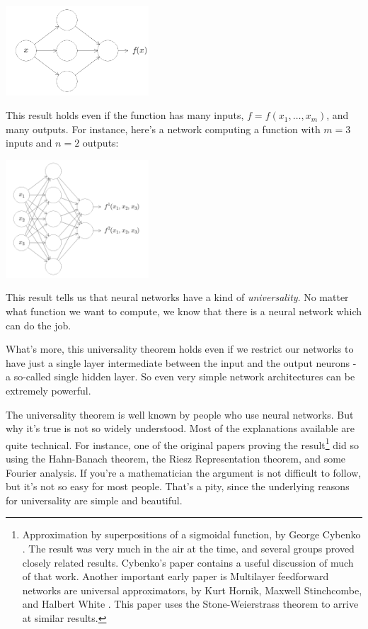 {\centering \includegraphics[width=0.4\textwidth,]{pic/wigglyfn02.png} \par}

This result holds even if the function has many inputs, $f=f(x_1,\ldots,x_m)$, and many outputs. For instance, here's a network computing a function with $m=3$ inputs and $n=2$
outputs:

{\centering \includegraphics[width=0.4\textwidth,]{pic/wigglyfn03.png} \par}

This result tells us that neural networks have a kind of \textit{universality}. No matter what function we want to compute, we know that there is a neural network which can do the job.

What's more, this universality theorem holds even if we restrict our networks to have just a single layer intermediate between the input and the output neurons - a so-called single hidden layer. So even very simple network architectures can be extremely powerful.

The universality theorem is well known by people who use neural networks. But why it's true is not so widely understood. Most of the explanations available are quite technical. For instance, one of the original papers proving the result\footnote{Approximation by superpositions of a sigmoidal function, by George Cybenko \cite{Cybenko1989}. The result was very much in the air at the time, and several groups proved closely related results. Cybenko's paper contains a useful discussion of much of that work. Another important early paper is Multilayer feedforward networks are universal approximators, by Kurt Hornik, Maxwell Stinchcombe, and Halbert White \cite{Hornik1989}. This paper uses the Stone-Weierstrass theorem to arrive at similar results.} did so using the Hahn-Banach theorem, the Riesz Representation theorem, and some Fourier analysis. If you're a mathematician the argument is not difficult to follow, but it's not so easy for most people. That's a pity, since the underlying reasons for universality are simple and beautiful.

